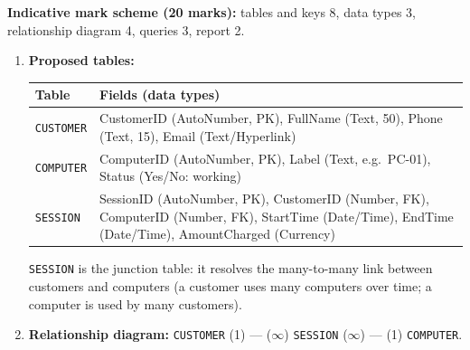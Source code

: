 \documentclass[11pt]{article}
\begin{document}
\begin{corrige}
\textbf{Indicative mark scheme (20 marks):} tables and keys 8, data types 3, relationship diagram 4, queries 3, report 2.
\begin{enumerate}
\item \textbf{Proposed tables:}
\begin{center}
\begin{tabularx}{\linewidth}{|l|X|}
\hline
\rowcolor{popblueL} \textbf{Table} & \textbf{Fields (data types)} \\
\hline
\texttt{CUSTOMER} & CustomerID (AutoNumber, PK), FullName (Text, 50), Phone (Text, 15), Email (Text/Hyperlink) \\
\hline
\texttt{COMPUTER} & ComputerID (AutoNumber, PK), Label (Text, e.g.\ PC-01), Status (Yes/No: working) \\
\hline
\texttt{SESSION} & SessionID (AutoNumber, PK), CustomerID (Number, FK), ComputerID (Number, FK), StartTime (Date/Time), EndTime (Date/Time), AmountCharged (Currency) \\
\hline
\end{tabularx}
\end{center}
\texttt{SESSION} is the junction table: it resolves the many-to-many link between customers and computers (a customer uses many computers over time; a computer is used by many customers).
\item \textbf{Relationship diagram:} \texttt{CUSTOMER} (1) --- ($\infty$) \texttt{SESSION} ($\infty$) --- (1) \texttt{COMPUTER}.
\begin{popfigure}
\begin{center}
\end{center}
\end{popfigure}
\end{enumerate}
\end{corrige}
\end{document}
